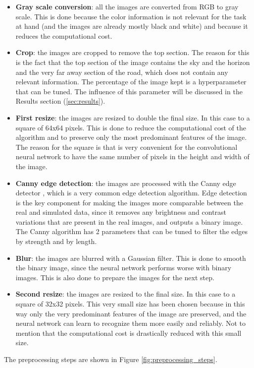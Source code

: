\documentclass[a4paper,12pt,sort&compress]{article}
\begin{document}
    \begin{itemize}
        \item \textbf{Gray scale conversion}: all the images are converted from RGB to gray scale.
        This is done because the color information is not relevant for the task at hand (and the
        images are already mostly black and white) and because it reduces the computational cost.
        \item \textbf{Crop}: the images are cropped to remove the top section. The reason for this
        is the fact that the top section of the image contains the sky and the horizon and the very
        far away section of the road, which does not contain any relevant information. The
        percentage of the image kept is a hyperparameter that can be tuned. The influence of this
        parameter will be discussed in the Results section (\ref*{sec:results}).
        \item \textbf{First resize}: the images are resized to double the final size. In this case
        to a square of 64x64 pixels. This is done to reduce the computational cost of the algorithm
        and to preserve only the most predominant features of the image. The reason for the square
        is that is very convenient for the convolutional neural network to have the same number of 
        pixels in the height and width of the image.
        \item \textbf{Canny edge detection}: the images are processed with the Canny edge detector
        \citep*{canny}, which is a very common edge detection algorithm. Edge detection is the key
        component for making the images more comparable between the real and simulated data, since
        it removes any brightness and contrast variations that are present in the real images, and
        outputs a binary image. The Canny algorithm has 2 parameters that can be tuned to filter the
        edges by strength and by length.   
        \item \textbf{Blur}: the images are blurred with a Gaussian filter. This is done to smooth
        the binary image, since the neural network performs worse with binary images. This is also
        done to prepare the images for the next step. 
        \item \textbf{Second resize}: the images are resized to the final size. In this case to a
        square of 32x32 pixels. This very small size has been chosen because in this way only the
        very predominant features of the image are preserved, and the neural network can learn to
        recognize them more easily and reliably. Not to mention that the computational cost is
        drastically reduced with this small size.
    \end{itemize}
    The preprocessing steps are shown in Figure \ref{fig:preprocessing_steps}.
\end{document}
